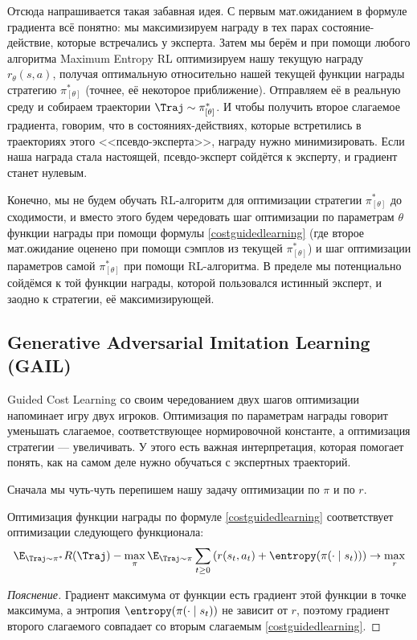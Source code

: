 Отсюда напрашивается такая забавная идея. С первым мат.ожиданием в формуле градиента всё понятно: мы максимизируем награду в тех парах состояние-действие, которые встречались у эксперта. Затем мы берём и при помощи любого алгоритма Maximum Entropy RL оптимизируем нашу текущую награду $r_\theta(s, a)$, получая оптимальную относительно нашей текущей функции награды стратегию $\pi^*_{[\theta]}$ (точнее, её некоторое приближение). Отправляем её в реальную среду и собираем траектории $\Traj \sim \pi^*_{[\theta]}$. И чтобы получить второе слагаемое градиента, говорим, что в состояниях-действиях, которые встретились в траекториях этого <<псевдо-эксперта>>, награду нужно минимизировать. Если наша награда стала настоящей, псевдо-эксперт сойдётся к эксперту, и градиент станет нулевым.

Конечно, мы не будем обучать RL-алгоритм для оптимизации стратегии $\pi^*_{[\theta]}$ до сходимости, и вместо этого будем чередовать шаг оптимизации по параметрам $\theta$ функции награды при помощи формулы \eqref{costguidedlearning} (где второе мат.ожидание оценено при помощи сэмплов из текущей $\pi^*_{[\theta]}$) и шаг оптимизации параметров самой $\pi^*_{[\theta]}$ при помощи RL-алгоритма. В пределе мы потенциально сойдёмся к той функции награды, которой пользовался истинный эксперт, и заодно к стратегии, её максимизирующей.

\subsection{Generative Adversarial Imitation Learning (GAIL)}

Guided Cost Learning со своим чередованием двух шагов оптимизации напоминает игру двух игроков. Оптимизация по параметрам награды говорит уменьшать слагаемое, соответствующее нормировочной константе, а оптимизация стратегии --- увеличивать. У этого есть важная интерпретация, которая помогает понять, как на самом деле нужно обучаться с экспертных траекторий.

Сначала мы чуть-чуть перепишем нашу задачу оптимизации по $\pi$ и по $r$.

\begin{proposition}
Оптимизация функции награды по формуле \eqref{costguidedlearning} соответствует оптимизации следующего функционала:
\begin{equation}\label{irl_dual}
\E_{\Traj \sim \pi^*} R(\Traj) - \max_{\pi} \E_{\Traj \sim \pi} \sum_{t \ge 0} \left( r(s_t, a_t) + \entropy(\pi(\cdot \mid s_t)) \right) \to \max_{r}
\end{equation}
\begin{proof}[Пояснение]
Градиент максимума от функции есть градиент этой функции в точке максимума, а энтропия $\entropy(\pi(\cdot \mid s_t))$ не зависит от $r$, поэтому градиент второго слагаемого совпадает со вторым слагаемым \eqref{costguidedlearning}.
\end{proof}
\end{proposition}

